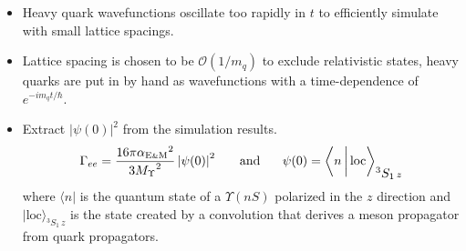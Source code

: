 \begin{slide*}

\slideframe{}
\LARGE

\begin{minipage}{\linewidth}


\vfill

\begin{itemize}

  \item Heavy quark wavefunctions oscillate too rapidly in $t$ to
  efficiently simulate with small lattice spacings.

  \vfill

  \item Lattice spacing is chosen to be ${\mathcal O}(1/m_q)$ to
  exclude relativistic states, heavy quarks are put in by hand as
  wavefunctions with a time-dependence of $e^{-i m_q t/\hbar}$.

\end{itemize}

\vspace{1cm}


\vfill

\begin{itemize}

  \item Extract $\left| \psi(0) \right|^2$ from the simulation results.
\[ \Gamma_{ee} = \frac{16 \pi \mbox{$\alpha_{\mbox{\scriptsize E{\tiny \&}M}}$}^2}{
   3 \mbox{$M_\Upsilon$}^2} \left| \psi(0) \right|^2
  \hspace{5mm} \mbox{ and } \hspace{5mm}
  \psi(0) = \left\langle n \, \bigg| \, \mbox{loc} \right\rangle_{\mbox{$^3S_1$}\,z}
\]
  where $\big\langle n \big|$ is the quantum state of a $\Upsilon(nS)$
  polarized in the $z$ direction and $\big| \mbox{loc}
  \big\rangle_{\mbox{$^3S_1$}\,z}$ is the state created by a
  convolution that derives a meson propagator from quark propagators.

\end{itemize}

\end{minipage}

\end{slide*}


